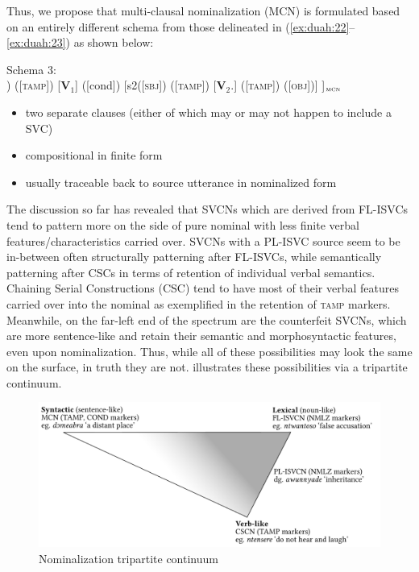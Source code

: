 \documentclass[output=paper]{../langsci/langscibook}
\begin{document}
Thus, we propose that multi-clausal nominalization (MCN) is formulated based on an entirely different schema from those delineated in (\ref{ex:duah:22}--\ref{ex:duah:23}) as shown below:

\ea
Schema 3:\\	[s1 ([\textsc{sbj}]) ([\textsc{tamp}]) [\textbf{V}$_1$] ([cond])	[s2([\textsc{sbj}]) ([\textsc{tamp}])
										[\textbf{V}$_2$.]	([\textsc{tamp}]) ([\textsc{obj}])] ]$_{\textsc{mcn}}$
\begin{itemize}
\item two separate clauses (either of which may or may not happen to include a SVC)
\item compositional in finite form
\item usually traceable back to source utterance in nominalized form
\end{itemize}
\z

The discussion so far has revealed that SVCNs which are derived from FL-ISVCs tend to pattern more on the side of pure nominal with less finite verbal features/characteristics carried over. SVCNs with a PL-ISVC source seem to be in-between often structurally patterning after FL-ISVCs, while semantically patterning after CSCs in terms of retention of individual verbal semantics. Chaining Serial Constructions (CSC) tend to have most of their verbal features carried over into the nominal as exemplified in the retention of \textsc{tamp} markers. Meanwhile, on the far-left end of the spectrum are the counterfeit SVCNs, which are more sentence-like and retain their semantic and morphosyntactic features, even upon nominalization. Thus, while all of these possibilities may look the same on the surface, in truth they are not.  illustrates these possibilities via a tripartite continuum.

\begin{figure}
\includegraphics[width=\textwidth]{fig-duah-2}
\caption{Nominalization tripartite continuum}
\label{fig:duah:4}
\end{figure}
\end{document}
